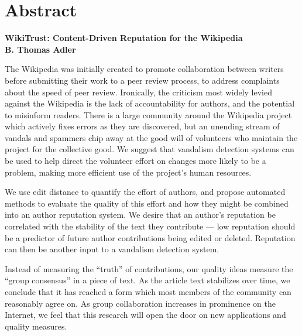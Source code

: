 \chapter{Abstract}
\begin{center}
\textbf{WikiTrust: Content-Driven Reputation for the Wikipedia}\\
\textbf{B. Thomas Adler}
\end{center}

The Wikipedia was initially created to promote collaboration between writers
before submitting their work to a peer review process, to address
complaints about the speed of peer review.
Ironically, the criticism most widely levied against the Wikipedia
is the lack of accountability
for authors,
and the potential to misinform readers.
There is a large community around the Wikipedia project which actively
fixes errors as they are discovered, but an unending
stream of vandals and spammers chip
away at the good will of volunteers who
maintain the project for the collective good.
We suggest that vandalism detection systems can be used to help direct
the volunteer effort on changes more likely to be a problem,
making more efficient use of the project's human resources.

We use edit distance to quantify the effort of authors, and propose
automated methods to evaluate the quality of this effort
and how they might be combined into an author reputation system.
We desire that an author's reputation be correlated with the
stability of the text they contribute ---
low reputation should be a predictor of future author
contributions being edited or deleted.
Reputation can then be another input to a vandalism detection system.

Instead of measuring the ``truth'' of contributions, our quality ideas
measure the ``group consensus'' in a piece of text.
As the article text stabilizes over time, we conclude that
it has reached a form which most members of the community can
reasonably agree on.
As group collaboration increases in prominence on the Internet,
we feel that this research will open the door on new applications
and quality measures.

